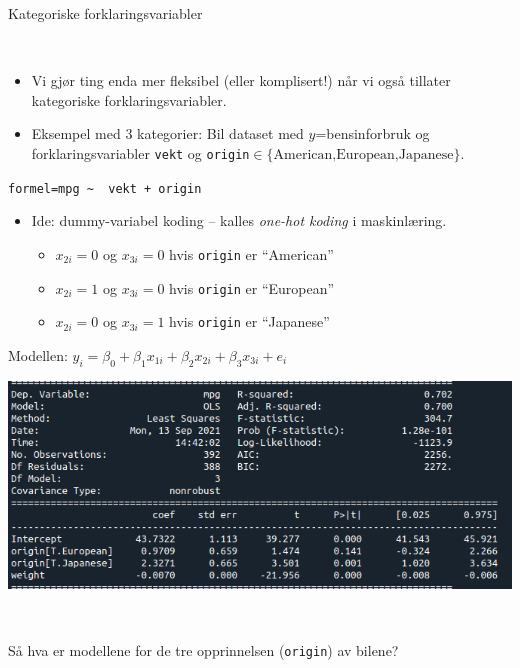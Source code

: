 \documentclass[10pt,ignorenonframetext,]{beamer}
\providecommand{\tightlist}{%
  \setlength{\itemsep}{0pt}\setlength{\parskip}{0pt}}
\begin{document}
\begin{frame}[fragile]

\begin{block}{Kategoriske forklaringsvariabler}

\(~\)

\begin{itemize}
\tightlist
\item
  Vi gjør ting enda mer fleksibel (eller komplisert!) når vi også
  tillater kategoriske forklaringsvariabler.
\end{itemize}

\vspace{2mm}

\begin{itemize}
\tightlist
\item
  Eksempel med 3 kategorier: Bil dataset med \(y\)=bensinforbruk og
  forklaringsvariabler \texttt{vekt} og
  \texttt{origin}\(\in \{\text{American,European,Japanese}\}\).
\end{itemize}

\centering

\vspace{4mm}

\texttt{formel=\textquotesingle{}mpg\ \textasciitilde{}\ \ vekt\ +\ origin\textquotesingle{}}

\flushleft

\vspace{4mm}

\begin{itemize}
\item
  Ide: dummy-variabel koding -- kalles \emph{one-hot koding} i
  maskinlæring.

  \begin{itemize}
  \tightlist
  \item
    \(x_{2i}=0\) og \(x_{3i}=0\) hvis \texttt{origin} er ``American''
  \item
    \(x_{2i}=1\) og \(x_{3i}=0\) hvis \texttt{origin} er ``European''
  \item
    \(x_{2i}=0\) og \(x_{3i}=1\) hvis \texttt{origin} er ``Japanese''
  \end{itemize}
\end{itemize}

\vspace{4mm}

Modellen:
\(y_i = \beta_0 + \beta_1 x_{1i} + \beta_2 x_{2i} + \beta_3 x_{3i} + e_i\)

\end{block}

\end{frame}

\begin{frame}[fragile]

\includegraphics{kategorisk_variabel.png}

\(~\)

Så hva er modellene for de tre opprinnelsen (\texttt{origin}) av bilene?

\end{frame}
\end{document}
